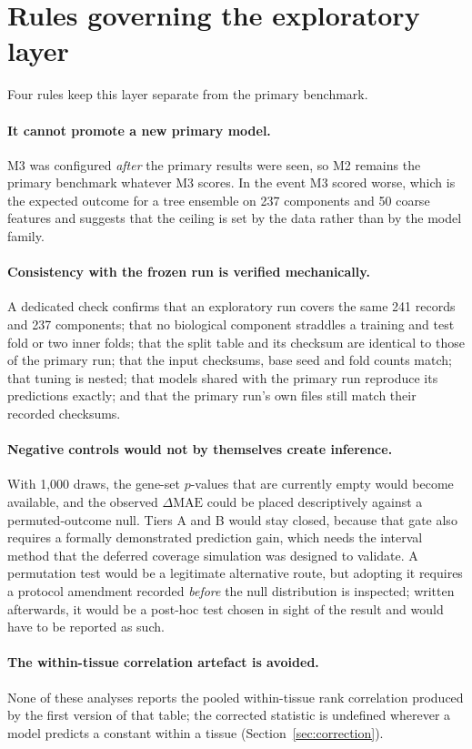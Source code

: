 \section{Rules governing the exploratory layer}\label{sec:rules}

Four rules keep this layer separate from the primary benchmark.

\paragraph{It cannot promote a new primary model.} M3 was configured \emph{after} the
primary results were seen, so M2 remains the primary benchmark whatever M3 scores. In the
event M3 scored worse, which is the expected outcome for a tree ensemble on 237 components
and 50 coarse features and suggests that the ceiling is set by the data rather than by the
model family.

\paragraph{Consistency with the frozen run is verified mechanically.} A dedicated check
confirms that an exploratory run covers the same 241 records and 237 components; that no
biological component straddles a training and test fold or two inner folds; that the split
table and its checksum are identical to those of the primary run; that the input
checksums, base seed and fold counts match; that tuning is nested; that models shared with
the primary run reproduce its predictions exactly; and that the primary run's own files
still match their recorded checksums.

\paragraph{Negative controls would not by themselves create inference.} With 1,000 draws,
the gene-set $p$-values that are currently empty would become available, and the observed
$\Delta\mathrm{MAE}$ could be placed descriptively against a permuted-outcome null. Tiers A
and B would stay closed, because that gate also requires a formally demonstrated prediction
gain, which needs the interval method that the deferred coverage simulation was designed to
validate. A permutation test would be a legitimate alternative route, but adopting it
requires a protocol amendment recorded \emph{before} the null distribution is inspected;
written afterwards, it would be a post-hoc test chosen in sight of the result and would have
to be reported as such.

\paragraph{The within-tissue correlation artefact is avoided.} None of these analyses
reports the pooled within-tissue rank correlation produced by the first version of that
table; the corrected statistic is undefined wherever a model predicts a constant within a
tissue (Section~\ref{sec:correction}).
